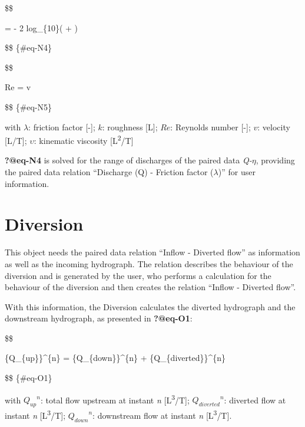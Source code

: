 \documentclass[
  letterpaper,
  DIV=11,
  numbers=noendperiod]{scrreprt}
\begin{document}
\$\$

 = - 2 \cdot log\_\{10\}\left(  +
 \right)

\$\$ \{\#eq-N4\}

\$\$

Re = v \cdot {}

\$\$ \{\#eq-N5\}

with \(\lambda\): friction factor {[}-{]}; \(k\): roughness {[}L{]};
\(Re\): Reynolds number {[}-{]}; \(v\): velocity {[}L/T{]};
\(\upsilon\): kinematic viscosity {[}L\textsuperscript{2}/T{]}

\textbf{?@eq-N4} is solved for the range of discharges of the paired
data \emph{Q-}\(\eta\), providing the paired data relation ``Discharge
(Q) - Friction factor (\(\lambda\))'' for user information.

\hypertarget{sec-model_diversion}{%
\chapter{Diversion}\label{sec-model_diversion}}

This object needs the paired data relation ``Inflow - Diverted flow'' as
information as well as the incoming hydrograph. The relation describes
the behaviour of the diversion and is generated by the user, who
performs a calculation for the behaviour of the diversion and then
creates the relation ``Inflow - Diverted flow''.

With this information, the Diversion calculates the diverted hydrograph
and the downstream hydrograph, as presented in \textbf{?@eq-O1}:

\$\$

\{Q\_\{up\}\}\^{}\{n\} = \{Q\_\{down\}\}\^{}\{n\} +
\{Q\_\{diverted\}\}\^{}\{n\}

\$\$ \{\#eq-O1\}

with \({Q_{up}}^n\): total flow upstream at instant \emph{n}
{[}L\textsuperscript{3}/T{]}; \({Q_{diverted}}^n\): diverted flow at
instant \emph{n} {[}L\textsuperscript{3}/T{]}; \({Q_{down}}^n\):
downstream flow at instant \emph{n} {[}L\textsuperscript{3}/T{]}.
\end{document}
